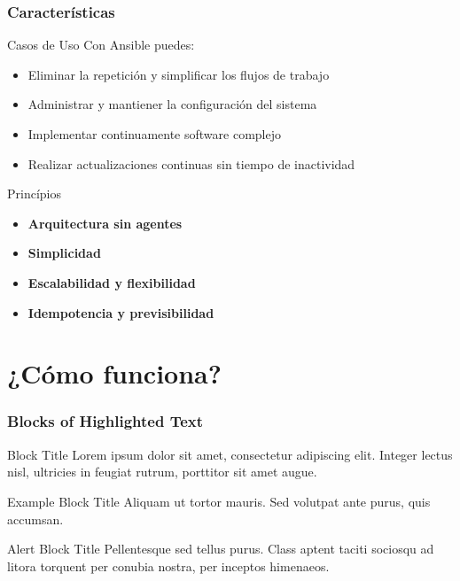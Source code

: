 \documentclass[
	11pt, %
]{beamer}
\begin{document}
\begin{frame}
	\frametitle{Características}

        \begin{exampleblock}{Casos de Uso}
        Con Ansible puedes:
		\begin{itemize}
		    \item Eliminar la repetición y simplificar los flujos de trabajo
                \item Administrar y mantiener la configuración del sistema
                \item Implementar continuamente software complejo
                \item Realizar actualizaciones continuas sin tiempo de inactividad
		\end{itemize}
	\end{exampleblock}

        \begin{exampleblock}{Princípios}
		\begin{itemize}
		    \item \textbf{Arquitectura sin agentes}
                \item \textbf{Simplicidad}
                \item \textbf{Escalabilidad y flexibilidad}
                \item \textbf{Idempotencia y previsibilidad}
		\end{itemize}
	\end{exampleblock}

\end{frame}


\section{¿Cómo funciona?}

\begin{frame}
	\frametitle{Blocks of Highlighted Text}
	
	\begin{block}{Block Title}
		Lorem ipsum dolor sit amet, consectetur adipiscing elit. Integer lectus nisl, ultricies in feugiat rutrum, porttitor sit amet augue.
	\end{block}
	
	\begin{exampleblock}{Example Block Title}
		Aliquam ut tortor mauris. Sed volutpat ante purus, quis accumsan.
	\end{exampleblock}
	
	\begin{alertblock}{Alert Block Title}
		Pellentesque sed tellus purus. Class aptent taciti sociosqu ad litora torquent per conubia nostra, per inceptos himenaeos.
	\end{alertblock}

\end{frame}
\end{document}
